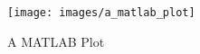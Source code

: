 \begin{figure}[H]
\begin{center}
  \texttt{[image: images/a\_matlab\_plot]}
  \caption{A MATLAB Plot}
  \label{fig:a_matlab_plot}
\end{center}
\end{figure}
